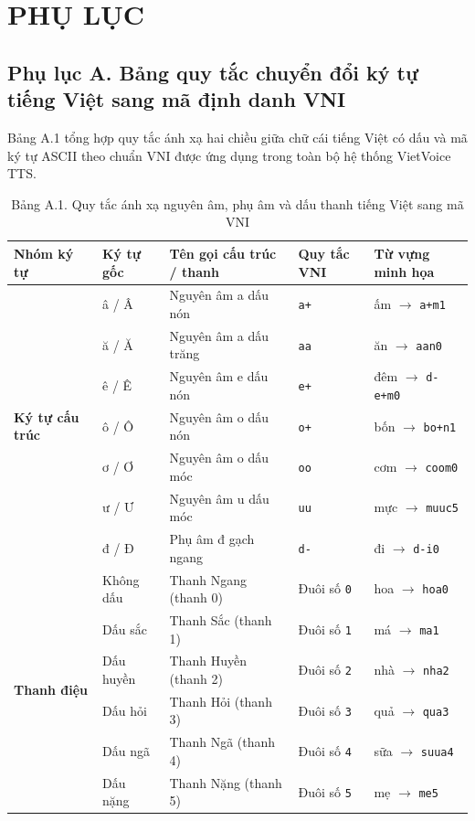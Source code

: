 \section*{PHỤ LỤC}

\subsection*{Phụ lục A. Bảng quy tắc chuyển đổi ký tự tiếng Việt sang mã định danh VNI}
\label{app:vni_mapping_table}

Bảng A.1 tổng hợp quy tắc ánh xạ hai chiều giữa chữ cái tiếng Việt có dấu và mã ký tự ASCII theo chuẩn VNI được ứng dụng trong toàn bộ hệ thống VietVoice TTS.

\begin{table}[H]
\centering
\caption*{Bảng A.1. Quy tắc ánh xạ nguyên âm, phụ âm và dấu thanh tiếng Việt sang mã VNI}
\vspace{2pt}
\begin{tabularx}{\textwidth}{p{2.6cm}p{1.8cm}p{4.2cm}p{2.4cm}X}
\toprule
\textbf{Nhóm ký tự} & \textbf{Ký tự gốc} & \textbf{Tên gọi cấu trúc / thanh} & \textbf{Quy tắc VNI} & \textbf{Từ vựng minh họa} \\
\midrule
\multirow{7}{*}{\textbf{Ký tự cấu trúc}} 
& â / Â & Nguyên âm a dấu nón & \texttt{a+} & ấm $\to$ \texttt{a+m1} \\
& ă / Ă & Nguyên âm a dấu trăng & \texttt{aa} & ăn $\to$ \texttt{aan0} \\
& ê / Ê & Nguyên âm e dấu nón & \texttt{e+} & đêm $\to$ \texttt{d-e+m0} \\
& ô / Ô & Nguyên âm o dấu nón & \texttt{o+} & bốn $\to$ \texttt{bo+n1} \\
& ơ / Ơ & Nguyên âm o dấu móc & \texttt{oo} & cơm $\to$ \texttt{coom0} \\
& ư / Ư & Nguyên âm u dấu móc & \texttt{uu} & mực $\to$ \texttt{muuc5} \\
& đ / Đ & Phụ âm đ gạch ngang & \texttt{d-} & đi $\to$ \texttt{d-i0} \\
\midrule
\multirow{6}{*}{\textbf{Thanh điệu}} 
& Không dấu & Thanh Ngang (thanh 0) & Đuôi số \texttt{0} & hoa $\to$ \texttt{hoa0} \\
& Dấu sắc & Thanh Sắc (thanh 1) & Đuôi số \texttt{1} & má $\to$ \texttt{ma1} \\
& Dấu huyền & Thanh Huyền (thanh 2) & Đuôi số \texttt{2} & nhà $\to$ \texttt{nha2} \\
& Dấu hỏi & Thanh Hỏi (thanh 3) & Đuôi số \texttt{3} & quả $\to$ \texttt{qua3} \\
& Dấu ngã & Thanh Ngã (thanh 4) & Đuôi số \texttt{4} & sữa $\to$ \texttt{suua4} \\
& Dấu nặng & Thanh Nặng (thanh 5) & Đuôi số \texttt{5} & mẹ $\to$ \texttt{me5} \\
\bottomrule
\end{tabularx}
\end{table}

